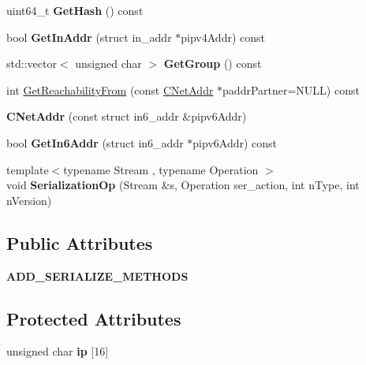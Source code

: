 \begin{DoxyCompactItemize}
uint64\+\_\+t {\bfseries Get\+Hash} () const
\item 
\mbox{\label{class_c_net_addr_a4f73432c55d4acb6b9e4c54833eefea6}} 
bool {\bfseries Get\+In\+Addr} (struct in\+\_\+addr $\ast$pipv4\+Addr) const
\item 
\mbox{\label{class_c_net_addr_a6f8211515f809f6972ce327433d41458}} 
std\+::vector$<$ unsigned char $>$ {\bfseries Get\+Group} () const
\item 
int \mbox{\hyperlink{class_c_net_addr_aa68c7d6112b22759dcd280ddad30808f}{Get\+Reachability\+From}} (const \mbox{\hyperlink{class_c_net_addr}{C\+Net\+Addr}} $\ast$paddr\+Partner=N\+U\+LL) const
\item 
\mbox{\label{class_c_net_addr_a9eae4232457f7659a157467274d1b444}} 
{\bfseries C\+Net\+Addr} (const struct in6\+\_\+addr \&pipv6\+Addr)
\item 
\mbox{\label{class_c_net_addr_a3616012f94b27148e5b8e27d943d4884}} 
bool {\bfseries Get\+In6\+Addr} (struct in6\+\_\+addr $\ast$pipv6\+Addr) const
\item 
\mbox{\label{class_c_net_addr_a7c914d155a533f64f8aa0d2f9bfff8a7}} 
{\footnotesize template$<$typename Stream , typename Operation $>$ }\\void {\bfseries Serialization\+Op} (Stream \&s, Operation ser\+\_\+action, int n\+Type, int n\+Version)
\end{DoxyCompactItemize}
\subsection*{Public Attributes}
\begin{DoxyCompactItemize}
\item 
\mbox{\label{class_c_net_addr_ab08e22719f96b42c61e998158a895e5f}} 
{\bfseries A\+D\+D\+\_\+\+S\+E\+R\+I\+A\+L\+I\+Z\+E\+\_\+\+M\+E\+T\+H\+O\+DS}
\end{DoxyCompactItemize}
\subsection*{Protected Attributes}
\begin{DoxyCompactItemize}
\item 
\mbox{\label{class_c_net_addr_acff7ce68f33f8dfbfe6d79d80928d417}} 
unsigned char {\bfseries ip} \mbox{[}16\mbox{]}
\end{DoxyCompactItemize}
